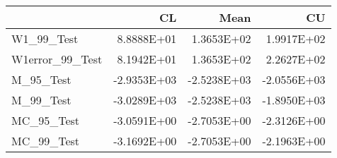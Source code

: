 \begin{tabular}{lrrr}
\toprule
{} &          CL &        Mean &          CU \\
\midrule
W1\_99\_Test      &  8.8888E+01 &  1.3653E+02 &  1.9917E+02 \\
W1error\_99\_Test &  8.1942E+01 &  1.3653E+02 &  2.2627E+02 \\
M\_95\_Test       & -2.9353E+03 & -2.5238E+03 & -2.0556E+03 \\
M\_99\_Test       & -3.0289E+03 & -2.5238E+03 & -1.8950E+03 \\
MC\_95\_Test      & -3.0591E+00 & -2.7053E+00 & -2.3126E+00 \\
MC\_99\_Test      & -3.1692E+00 & -2.7053E+00 & -2.1963E+00 \\
\bottomrule
\end{tabular}
